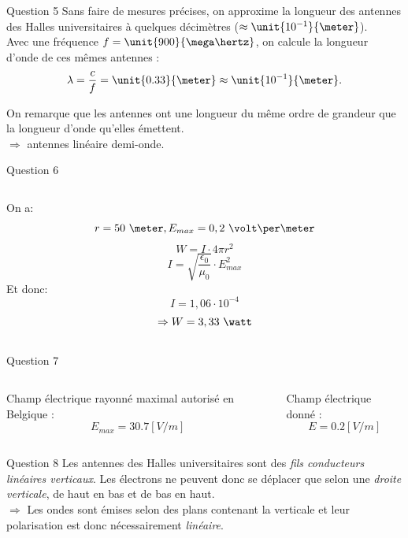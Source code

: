\documentclass{beamer}
\begin{document}
\begin{frame}{Question 5}
	    Sans faire de mesures précises, on approxime la longueur des antennes des Halles universitaires à quelques décimètres ($\approx \unit{10^{-1}}{\meter}$).\\[0.5em]
	    Avec une fréquence $f = \unit{900}{\mega\hertz}$, on calcule la longueur d'onde de ces mêmes antennes :
	    \[
	        \lambda = \frac{c}{f} = \unit{0.33}{\meter} \approx \unit{10^{-1}}{\meter}
	        \text.
	    \]
	    
	    On remarque que les antennes ont une longueur du même ordre de grandeur que la longueur d'onde qu'elles émettent.\\[0.5em]
	    
	    $\Rightarrow$ antennes linéaire demi-onde.
\end{frame}

\begin{frame}{Question 6}
	\begin{columns}
		\begin{column}{0.70\textwidth}
	    		On a:
			$$r = 50\ \meter, E_{max} = 0,2\ \volt\per\meter$$
			$$W = I \cdot 4\pi r^2$$
			$$I = \sqrt{\frac{\epsilon_0}{\mu_0}}\cdot E_{max}^2$$
			Et donc:
			$$I= 1,06\cdot10^{-4}$$
			$$\Rightarrow W = 3,33\ \watt$$
		
        		\end{column}
        	\end{columns}
\end{frame}

\begin{frame}{Question 7}
	\begin{columns}
		\begin{column}{0.40\textwidth}
			\begin{center}
			Champ électrique rayonné maximal autorisé en Belgique  : 
			$$E_{max} = 30.7 [V/m] $$
	    		
        		\end{center}
        	\end{column}
        	\begin{column}{0.40\textwidth}
			\begin{center}
	    Champ électrique donné : 
	    $$ E = 0.2 [V/m]$$
	    
        	\end{center}
        	\end{column}
        	\end{columns}
        	        	
\end{frame}

\begin{frame}{Question 8}
    Les antennes des Halles universitaires sont des \emph{fils conducteurs linéaires verticaux}. Les électrons ne peuvent donc se déplacer que selon une \emph{droite verticale}, de haut en bas et de bas en haut.\\[0.5em]
    
    $\Rightarrow$ Les ondes sont émises selon des plans contenant la verticale et leur polarisation est donc nécessairement \emph{linéaire}.
\end{frame}
\end{document}
